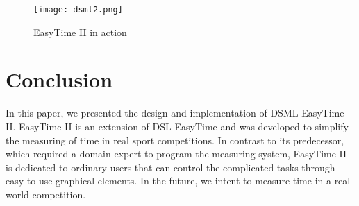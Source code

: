 \documentclass[preprint, prX]{revtex4}
\begin{document}
\begin{figure*}[htb]
\vspace{-5mm}
\begin{center}
\texttt{[image: dsml2.png]} \caption{EasyTime II in action}
\label{pic:dsml_example}
\end{center}
\vspace{-5mm}
\end{figure*}

\section{Conclusion}

In this paper, we presented the design and implementation of DSML EasyTime II. EasyTime II is an extension of DSL EasyTime and was developed to simplify the measuring of time in real sport competitions. In contrast to its predecessor, which required a domain expert to program the measuring system, EasyTime II is dedicated to ordinary users that can control the complicated tasks through easy to use graphical elements. In the future, we intent to measure time in a real-world competition. 
\end{document}
